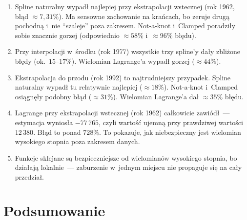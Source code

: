 \documentclass[12pt, a4paper]{article}
\begin{document}
\begin{enumerate}
  \item Spline naturalny wypadł najlepiej przy ekstrapolacji wstecznej
        (rok 1962, błąd $\approx 7{,}31\%$). Ma sensowne zachowanie na
        krańcach, bo zeruje drugą pochodną i~nie ``szaleje'' poza zakresem.
        Not-a-knot i~Clamped poradziły sobie znacznie gorzej
        (odpowiednio $\approx 58\%$ i~$\approx 96\%$ błędu).

  \item Przy interpolacji w~środku (rok 1977) wszystkie trzy spline'y
        dały zbliżone błędy (ok.~$15$--$17\%$). Wielomian Lagrange'a
        wypadł gorzej ($\approx 44\%$).

  \item Ekstrapolacja do przodu (rok 1992) to najtrudniejszy przypadek.
        Spline naturalny wypadł tu relatywnie najlepiej ($\approx 18\%$).
        Not-a-knot i~Clamped osiągnęły podobny błąd ($\approx 31\%$).
        Wielomian Lagrange'a dał $\approx 35\%$ błędu.

  \item Lagrange przy ekstrapolacji wstecznej (rok 1962) całkowicie
        zawiódł~--- estymacja wyniosła $-77\,765$, czyli wartość
        ujemną przy prawdziwej wartości $12\,380$. Błąd to
        ponad $728\%$. To pokazuje, jak niebezpieczny jest wielomian
        wysokiego stopnia poza zakresem danych.

  \item Funkcje sklejane są bezpieczniejsze od wielomianów wysokiego stopnia,
        bo działają lokalnie~--- zaburzenie w~jednym miejscu nie propaguje
        się na cały przedział.
\end{enumerate}

\section{Podsumowanie}
\end{document}
